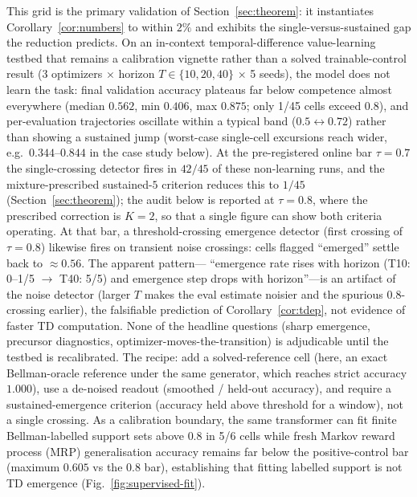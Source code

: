 \documentclass[11pt]{article}
\theoremstyle{plain}
\theoremstyle{definition}
\begin{document}
This grid is the primary validation of Section~\ref{sec:theorem}: it instantiates
Corollary~\ref{cor:numbers} to within $2\%$ and exhibits the single-versus-sustained gap the
reduction predicts.
On an in-context temporal-difference value-learning testbed that remains a calibration vignette rather than a solved trainable-control result (3 optimizers $\times$ horizon
$T \in \{10, 20, 40\}$ $\times$ 5 seeds), the model does not learn the task: final
validation accuracy plateaus far below competence almost everywhere (median $0.562$, min $0.406$, max
$0.875$; only 1/45 cells exceed $0.8$), and per-evaluation trajectories oscillate
within a typical band ($0.5 \leftrightarrow 0.72$) rather than showing a sustained jump
(worst-case single-cell excursions reach wider, e.g.\ $0.344$--$0.844$ in the case study below).
At the pre-registered online bar $\tau=0.7$ the single-crossing detector fires in $42/45$
of these non-learning runs, and the mixture-prescribed sustained-$5$ criterion reduces
this to $1/45$ (Section~\ref{sec:theorem}); the audit below is reported at $\tau=0.8$,
where the prescribed correction is $K=2$, so that a single figure can show both criteria
operating. At that bar, a threshold-crossing
emergence detector (first crossing of $\tau=0.8$) likewise fires on transient noise crossings:
cells flagged ``emerged'' settle back to $\approx 0.56$. The apparent pattern---
``emergence rate rises with horizon (T10: 0--1/5 $\to$ T40: 5/5) and emergence step drops
with horizon''---is an artifact of the noise detector (larger $T$ makes the eval estimate
noisier and the spurious $0.8$-crossing earlier), the falsifiable prediction of
Corollary~\ref{cor:tdep}, not evidence of faster TD computation.
None of the headline questions (sharp emergence, precursor diagnostics,
optimizer-moves-the-transition) is adjudicable until the testbed is recalibrated. The
recipe: add a solved-reference cell (here, an exact Bellman-oracle reference under the
same generator, which reaches strict accuracy $1.000$), use a de-noised readout
(smoothed / held-out accuracy), and require a sustained-emergence criterion (accuracy held
above threshold for a window), not a single crossing. As a calibration boundary, the same
transformer can fit finite Bellman-labelled support sets above $0.8$ in 5/6 cells while
fresh Markov reward process (MRP) generalisation accuracy remains far below the
positive-control bar (maximum $0.605$ vs the $0.8$ bar), establishing
that fitting labelled support is not TD emergence (Fig.~\ref{fig:supervised-fit}).
\end{document}
